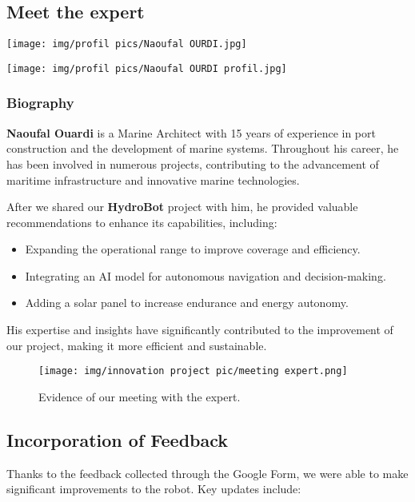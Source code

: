 \newpage
\subsection{Meet the expert}
\begin{minipage}{0.6\textwidth}
    \centering
    \texttt{[image: img/profil pics/Naoufal OURDI.jpg]}
\end{minipage}
\hfill
\begin{minipage}{0.35\textwidth}
    \centering
    \texttt{[image: img/profil pics/Naoufal OURDI profil.jpg]}
\end{minipage}
\subsubsection{Biography}

\textbf{Naoufal Ouardi} is a Marine Architect with 15 years of experience in port construction and the development of marine systems. Throughout his career, he has been involved in numerous projects, contributing to the advancement of maritime infrastructure and innovative marine technologies.

After we shared our \textbf{HydroBot} project with him, he provided valuable recommendations to enhance its capabilities, including:

\begin{itemize}
    \item Expanding the operational range to improve coverage and efficiency.
    \item Integrating an AI model for autonomous navigation and decision-making.
    \item Adding a solar panel to increase endurance and energy autonomy.
\end{itemize}

His expertise and insights have significantly contributed to the improvement of our project, making it more efficient and sustainable.
\begin{figure}[h]
  \centering
  \texttt{[image: img/innovation project pic/meeting expert.png]}
  \caption{Evidence of our meeting with the expert.}
  \label{fig:meeting_expert}
\end{figure}


\newpage
\subsection{Incorporation of Feedback}
Thanks to the feedback collected through the Google Form, we were able to make significant improvements to the robot. Key updates include:

